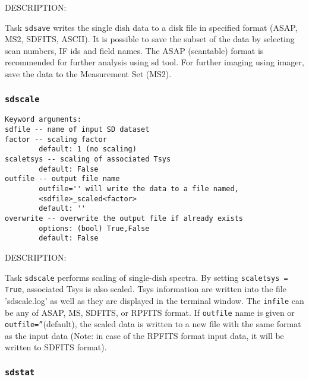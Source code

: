           DESCRIPTION:

          Task {\tt sdsave} writes the single dish data to a disk file in 
          specified format (ASAP, MS2, SDFITS, ASCII). It is possible to
          save the subset of the data by selecting scan numbers, IF ids
          and field names. The ASAP (scantable) format is recommended for
          further analysis using sd tool. For further imaging using imager,
          save the data to the Measurement Set (MS2).
    

\subsubsection{{\tt sdscale}}
\label{section:sd.sdtasks.tasks.sdscale}

\begin{verbatim}
Keyword arguments:
sdfile -- name of input SD dataset
factor -- scaling factor
        default: 1 (no scaling)
scaletsys -- scaling of associated Tsys
        default: False
outfile -- output file name
        outfile='' will write the data to a file named,
        <sdfile>_scaled<factor>
        default: ''
overwrite -- overwrite the output file if already exists
        options: (bool) True,False
        default: False
\end{verbatim}

    DESCRIPTION:

    Task {\tt sdscale} performs scaling of single-dish spectra.
    By setting {\tt scaletsys = True}, associated Tsys is also scaled.
    Tsys information are written into the file 'sdscale.log'
    as well as they are displayed in the terminal window.
    The {\tt infile} can be any of ASAP, MS, SDFITS, or RPFITS format.
    If {\tt outfile} name is given or {\tt outfile=''}(default), the scaled data is written
    to a new file with the same format as the input data (Note: in case of the
    RPFITS format input data, it will be written to SDFITS format).

\subsubsection{{\tt sdstat}}
\label{section:sd.sdtasks.tasks.sdstat}

